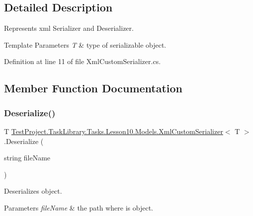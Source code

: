 \subsection{Detailed Description}
Represents xml Serializer and Deserializer. 


\begin{DoxyTemplParams}{Template Parameters}
{\em T} & type of serializable object.\\
\hline
\end{DoxyTemplParams}


Definition at line 11 of file Xml\+Custom\+Serializer.\+cs.



\subsection{Member Function Documentation}
\mbox{\label{class_test_project_1_1_task_library_1_1_tasks_1_1_lesson10_1_1_models_1_1_xml_custom_serializer_ab58e90ad5d153889408f12948a3438b6}} 
\subsubsection{\texorpdfstring{Deserialize()}{Deserialize()}}
{\footnotesize\ttfamily T \mbox{\hyperlink{class_test_project_1_1_task_library_1_1_tasks_1_1_lesson10_1_1_models_1_1_xml_custom_serializer}{Test\+Project.\+Task\+Library.\+Tasks.\+Lesson10.\+Models.\+Xml\+Custom\+Serializer}}$<$ T $>$.Deserialize (\begin{DoxyParamCaption}\item[{string}]{file\+Name }\end{DoxyParamCaption})}



Deserializes object. 


\begin{DoxyParams}{Parameters}
{\em file\+Name} & the path where is object.\\
\hline
\end{DoxyParams}



